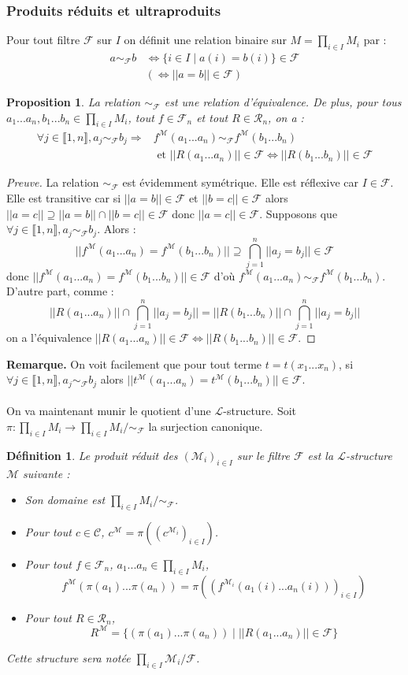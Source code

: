 \documentclass[11pt,a4paper]{article}
\newtheorem{defi}[theo]{Définition}
\newtheorem{prop}[theo]{Proposition}
\newcommand{\La}{\mathcal{L}}
\newcommand{\M}{\mathcal{M}}
\newcommand{\itemz}{\item[$\triangleright$]}
\newcommand{\F}{\mathcal{F}}
\newcommand{\gr}{\textbf}
\newcommand{\preuve}{\begin{proof}[Preuve]}
\newcommand{\cqfd}{\end{proof}}
\newcommand{\equi}{\Leftrightarrow}
\newcommand{\R}{\mathcal{R}}
\newcommand{\C}{\mathcal{C}}
\begin{document}
\subsubsection{Produits réduits et ultraproduits}
Pour tout filtre $\F$ sur $I$ on définit une relation binaire sur $M = \prod_{i\in I} M_i$ par :
\begin{align*}
a \sim_\F b & \equi \{ i \in I \mid a(i) = b(i) \} \in \F \\
& (\equi || a = b || \in \F) \end{align*}
\begin{prop}
La relation $\sim_\F$ est une relation d'équivalence. De plus, pour tous $a_1...a_n,b_1...b_n \in \prod_{i\in I} M_i$, tout $f \in \F_n$ et tout $R \in \R_n$, on a :
\begin{align*}
\forall j \in \llbracket 1,n \rrbracket, a_j \sim_\F b_j \Rightarrow & f^\M (a_1...a_n) \sim_\F f^\M (b_1...b_n) \\ & \text{ et } ||R(a_1...a_n)|| \in \F \equi ||R(b_1...b_n)||\in \F
\end{align*}
\end{prop}
\preuve
La relation $\sim_\F$ est évidemment symétrique. Elle est réflexive car $I \in \F$. Elle est transitive car si $|| a = b || \in \F$ et $|| b = c || \in \F$ alors $ || a = c || \supseteq || a = b || \cap || b = c || \in \F$ donc $|| a = c || \in \F$. Supposons que $\forall j \in \llbracket 1,n \rrbracket, a_j \sim_\F b_j$. Alors :
\[ || f^\M(a_1...a_n) = f^\M(b_1...b_n) || \supseteq \bigcap_{j=1}^n || a_j = b_j || \in \F \]
donc $|| f^\M(a_1...a_n) = f^\M(b_1...b_n) || \in \F$ d'où $f^\M(a_1...a_n) \sim_\F f^\M(b_1...b_n)$. D'autre part, comme :
\[ || R(a_1...a_n) || \cap \bigcap_{j=1}^n || a_j = b_j || = || R(b_1...b_n) || \cap \bigcap_{j=1}^n || a_j = b_j || \]
on a l'équivalence $ || R(a_1...a_n) || \in \F \equi || R(b_1...b_n) || \in \F$.
\cqfd
\gr{Remarque.} On voit facilement que pour tout terme $t = t(x_1...x_n)$, si $\forall j \in \llbracket 1,n \rrbracket, a_j \sim_\F b_j$ alors $|| t^\M (a_1...a_n) = t^\M (b_1...b_n) || \in \F$.\\\\
On va maintenant munir le quotient d'une $\La$-structure. Soit $\pi : \prod_{i\in I} M_i \to \prod_{i\in I} M_i / \sim_\F$ la surjection canonique.
\begin{defi}
Le produit réduit des $(\M_i)_{i\in I}$ sur le filtre $\F$ est la $\La$-structure $\M$ suivante :
\begin{itemize}
\setlength\itemsep{-0.3em}
\itemz Son domaine est $\prod_{i\in I} M_i / \sim_\F$.
\itemz Pour tout $c \in \C$, $c^\M = \pi((c^{\M_i})_{i\in I})$.
\itemz Pour tout $f \in \F_n$, $a_1...a_n \in \prod_{i\in I} M_i$,
\[ f^\M(\pi(a_1)...\pi(a_n)) = \pi((f^{\M_i}(a_1(i)...a_n(i)))_{i\in I}) \]
\itemz Pour tout $R \in \R_n$,
\[ R^\M = \{ (\pi(a_1)...\pi(a_n)) \mid || R(a_1...a_n) || \in \F \} \]
\end{itemize}
Cette structure sera notée $\prod_{i\in I} \M_i / \F$.
\end{defi}
\end{document}
